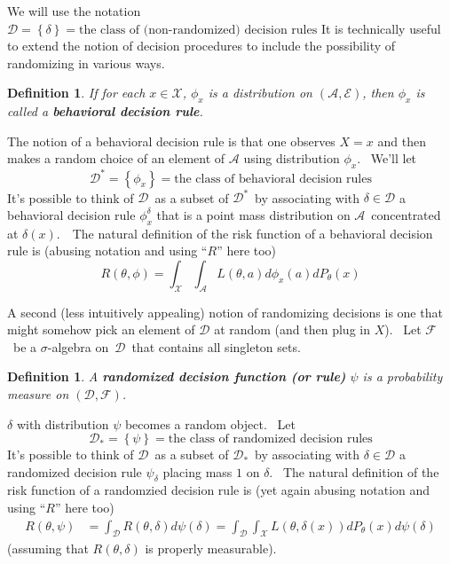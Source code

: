 \documentclass{article}
\newtheorem{definition}[theorem]{Definition}
\begin{document}
\clearpage   
\setcounter{theorem}{97}
We will use the notation $\mathcal{D}=\left\{  \delta\right\}  =\text{the class of (non-randomized)
decision rules}$
It is technically useful to extend the notion of decision procedures to include the possibility of randomizing in various ways.

\begin{definition}
\label{behavioral}If for each $x\in\mathcal{X}$, $\phi_{x}$ is a distribution
on $\left(  \mathcal{A},\mathcal{E}\right)  $, then $\phi_{x}$ is called a
\textbf{behavioral decision rule}.
\end{definition}

The notion of a behavioral decision rule is that one observes $X=x$ and then
makes a random choice of an element of $\mathcal{A}$ using distribution
$\phi_{x}$. \ We'll let%
\[
\mathcal{D}^{\ast}=\left\{  \phi_{x}\right\}  =\text{the class of behavioral
decision rules}%
\]
It's possible to think of $\mathcal{D}$\ as a subset of $\mathcal{D}^{\ast}%
$\ by associating with $\delta\in\mathcal{D}$ a behavioral decision rule
$\phi_{x}^{\delta}$ that is a point mass distribution on $\mathcal{A}%
$\ concentrated at $\delta\left(  x\right)  $.\ \ The natural definition of
the risk function of a behavioral decision rule is (abusing notation and using
``$R$'' here too)%
\[
R\left(  \theta,\phi\right)  =\int_{\mathcal{X}}\int_{\mathcal{A}}L\left(
\theta,a\right)  d\phi_{x}\left(  a\right)  dP_{\theta}\left(  x\right)
\]


A second (less intuitively appealing) notion of randomizing decisions is one
that might somehow pick an element of $\mathcal{D}$ at random (and then plug
in $X$). \ Let $\mathcal{F}$\ be a $\sigma$-algebra on\ $\mathcal{D}$\ that
contains all singleton sets.

\begin{definition}
\label{randomized}A \textbf{randomized decision function (or rule)} $\psi$ is
a probability measure on $\left(  \mathcal{D},\mathcal{F}\right)  $.
\end{definition}

$\delta$ with distribution $\psi$ becomes a random object. \ Let%
\[
\mathcal{D}_{\ast}=\left\{  \psi\right\}  =\text{the class of randomized
decision rules}%
\]
It's possible to think of $\mathcal{D}$\ as a subset of $\mathcal{D}_{\ast}%
$\ by associating with $\delta\in\mathcal{D}$ a randomized decision rule
$\psi_{\delta}$ placing mass $1$ on $\delta$. \ The natural definition of the
risk function of a randomzied decision rule is (yet again abusing notation and
using ``$R$'' here too)%
\begin{align*}
R\left(  \theta,\psi\right)   &  =\int_{\mathcal{D}}R\left(  \theta
,\delta\right)  d\psi\left(  \delta\right)  =\int_{\mathcal{D}}\int_{\mathcal{X}}L\left(  \theta,\delta\left(
x\right)  \right)  dP_{\theta}\left(  x\right)  d\psi\left(  \delta\right)
\end{align*}
(assuming that $R\left(  \theta,\delta\right)  $ is properly measurable).
\end{document}
